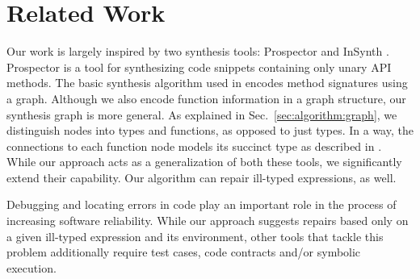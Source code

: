 \section{Related Work}
\label{sec:related}

Our work is largely inspired by two synthesis tools: Prospector \cite{MandelinetALL2005Jungloid} and InSynth \cite{GveroETAL13CompleteCompletionTypesWeights, DBLP:conf/cav/GveroKP11}. Prospector is a tool for synthesizing code snippets containing only unary API methods. The basic synthesis algorithm used in \cite{MandelinetALL2005Jungloid} encodes method signatures using a graph. Although we also encode function information in a graph structure, our synthesis graph is more general. As explained in Sec.~\ref{sec:algorithm:graph}, we distinguish nodes into types and functions, as opposed to just types. In a way, the connections to each function node models its succinct type as described in \cite{GveroETAL13CompleteCompletionTypesWeights}. While our approach acts as a generalization of both these tools, we significantly extend their capability. Our algorithm can repair ill-typed expressions, as well.

Debugging and locating errors in code \cite{Pavlinovic:2014, Chandra:2011:AD} play an important role in the process of increasing software reliability. While our approach suggests repairs based only on a given ill-typed expression and its environment, other tools that tackle this problem \cite{MintHint, DBLP:journals/tse/GouesNFW12, DBLP:conf/icse/NguyenQRC13, DBLP:conf/kbse/PeiWFNM11} additionally require test cases, code contracts and/or symbolic execution.
